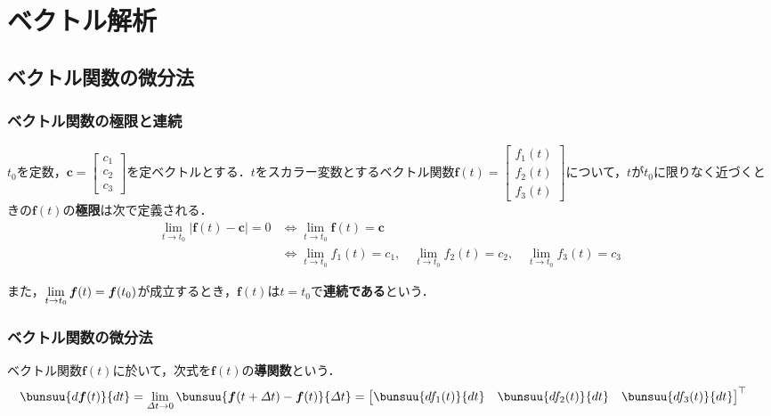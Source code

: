 \chapter{ベクトル解析}
\setcounter{page}{1}



\section{ベクトル関数の微分法}
\subsection{ベクトル関数の極限と連続}

$t_0$を定数，$\bm{c} = 
\begin{bmatrix}
	c_1\\ c_2\\ c_3
\end{bmatrix}
$を定ベクトルとする．$t$をスカラー変数とするベクトル関数$\bm{f}(t) = 
\begin{bmatrix}
	f_1(t)\\ f_2(t)\\ f_3(t)
\end{bmatrix}
$について，$t$が$t_0$に限りなく近づくときの$\bm{f}(t)$の\textbf{極限}は次で定義される．
\begin{align}
	\lim_{t \to t_0} |\bm{f}(t) - \bm{c}| = 0 &\iff \lim_{t \to t_0} \bm{f}(t) = \bm{c}\\
	&\iff \lim_{t \to t_0} f_1(t) = c_1,\quad \lim_{t \to t_0} f_2(t) = c_2,\quad \lim_{t \to t_0} f_3(t) = c_3
\end{align}

また，$\lim\limits_{t \to t_0} \bm{f}(t) = \bm{f}(t_0)$が成立するとき，$\bm{f}(t)$は$t = t_0$で\textbf{連続である}という．



\subsection{ベクトル関数の微分法}

ベクトル関数$\bm{f}(t)$に於いて，次式を$\bm{f}(t)$の\textbf{導関数}という．
\begin{align}
	\bunsuu{d\bm{f}(t)}{dt} &= \lim_{\varDelta t \to 0} \bunsuu{\bm{f}(t + \varDelta t) - \bm{f}(t)}{\varDelta t} =
	{
	\begin{bmatrix}
		\bunsuu{df_1(t)}{dt} &
		\bunsuu{df_2(t)}{dt} &
		\bunsuu{df_3(t)}{dt}
	\end{bmatrix}
	}^\top
\end{align}

